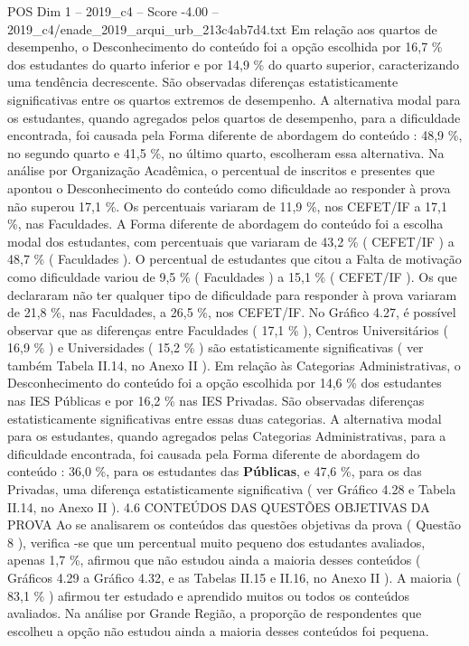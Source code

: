 \begin{textsample}{POS Dim 1 – 2019\_c4 – Score -4.00 – 2019\_c4/enade\_2019\_arqui\_urb\_213c4ab7d4.txt}
Em relação aos quartos de desempenho, o Desconhecimento do conteúdo foi a opção escolhida por 16,7 \% dos estudantes do quarto inferior e por 14,9 \% do quarto superior, caracterizando uma tendência decrescente.
São observadas diferenças estatisticamente significativas entre os quartos extremos de desempenho.
A alternativa modal para os estudantes, quando agregados pelos quartos de desempenho, para a dificuldade encontrada, foi causada pela Forma diferente de abordagem do conteúdo : 48,9 \%, no segundo quarto e 41,5 \%, no último quarto, escolheram essa alternativa.
Na análise por Organização Acadêmica, o percentual de inscritos e presentes que apontou o Desconhecimento do conteúdo como dificuldade ao responder à prova não superou 17,1 \%.
Os percentuais variaram de 11,9 \%, nos CEFET/IF a 17,1 \%, nas Faculdades.
A Forma diferente de abordagem do conteúdo foi a escolha modal dos estudantes, com percentuais que variaram de 43,2 \% ( CEFET/IF ) a 48,7 \% ( Faculdades ).
O percentual de estudantes que citou a Falta de motivação como dificuldade variou de 9,5 \% ( Faculdades ) a 15,1 \% ( CEFET/IF ).
Os que declararam não ter qualquer tipo de dificuldade para responder à prova variaram de 21,8 \%, nas Faculdades, a 26,5 \%, nos CEFET/IF.
No Gráfico 4.27, é possível observar que as diferenças entre Faculdades ( 17,1 \% ), Centros Universitários ( 16,9 \% ) e Universidades ( 15,2 \% ) são estatisticamente significativas ( ver também Tabela II.14, no Anexo II ).
Em relação às Categorias Administrativas, o Desconhecimento do conteúdo foi a opção escolhida por 14,6 \% dos estudantes nas IES Públicas e por 16,2 \% nas IES Privadas.
São observadas diferenças estatisticamente significativas entre essas duas categorias.
A alternativa modal para os estudantes, quando agregados pelas Categorias Administrativas, para a dificuldade encontrada, foi causada pela Forma diferente de abordagem do conteúdo : 36,0 \%, para os estudantes das \textbf{Públicas}, e 47,6 \%, para os das Privadas, uma diferença estatisticamente significativa ( ver Gráfico 4.28 e Tabela II.14, no Anexo II ). 4.6 CONTEÚDOS DAS QUESTÕES OBJETIVAS DA PROVA Ao se analisarem os conteúdos das questões objetivas da prova ( Questão 8 ), verifica -se que um percentual muito pequeno dos estudantes avaliados, apenas 1,7 \%, afirmou que não estudou ainda a maioria desses conteúdos ( Gráficos 4.29 a Gráfico 4.32, e as Tabelas II.15 e II.16, no Anexo II ).
A maioria ( 83,1 \% ) afirmou ter estudado e aprendido muitos ou todos os conteúdos avaliados.
Na análise por Grande Região, a proporção de respondentes que escolheu a opção não estudou ainda a maioria desses conteúdos foi pequena.

\end{textsample}
